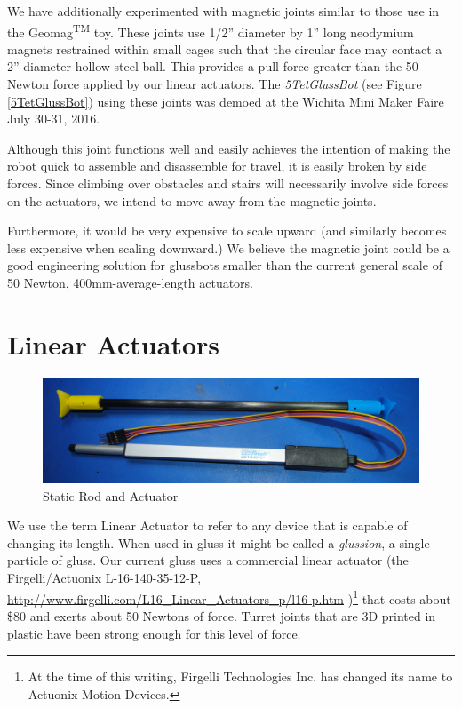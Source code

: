 \documentclass[11pt]{article}
\begin{document}
We have additionally experimented with magnetic joints similar to those use in the Geomag\textsuperscript{TM} toy.
These joints use 1/2'' diameter by 1'' long neodymium magnets restrained within small cages such that the circular face
may contact a 2'' diameter hollow steel ball.  This provides a pull force greater than the 50 Newton force applied by our linear
actuators. The \emph{5TetGlussBot} (see Figure \ref{5TetGlussBot}) using these
joints was demoed at the Wichita Mini Maker Faire July 30-31, 2016.

Although this joint functions well and easily achieves the intention of making the robot quick to assemble and disassemble for travel,
it is easily broken by side forces. Since climbing over obstacles and stairs will necessarily involve side forces on the actuators,
we intend to move away from the magnetic joints.

Furthermore, it would be very expensive to scale upward (and similarly becomes less expensive when
scaling downward.) We believe the magnetic joint could be a good engineering solution for glussbots smaller than the current
general scale of 50 Newton, 400mm-average-length actuators.


\section{Linear Actuators}
\label{linearactuators}

\begin{figure}[H]
  \centering
    \includegraphics[width=1.0\textwidth]{figures/CarbonFiberAndActuator.jpg}
    \caption[Static Rod and Actuator]{Static Rod and Actuator}
      \label{rodAndActuator}
\end{figure}

We use the term Linear Actuator to refer to any device that is capable of changing its length. When
used in gluss it might be called a \emph{glussion}, a single particle of gluss. Our current gluss
uses a commercial linear actuator (the Firgelli/Actuonix L-16-140-35-12-P,
\href{http://www.firgelli.com/L16_Linear_Actuators_p/l16-p.htm}{http://www.firgelli.com/L16\_Linear\_Actuators\_p/l16-p.htm}
)\footnote{At the time of this writing, Firgelli Technologies Inc. has changed its name to Actuonix Motion Devices.}
that costs about \$80 and exerts about 50 Newtons of force.
Turret joints that are 3D printed in plastic have been strong enough for this level of force.
\end{document}
